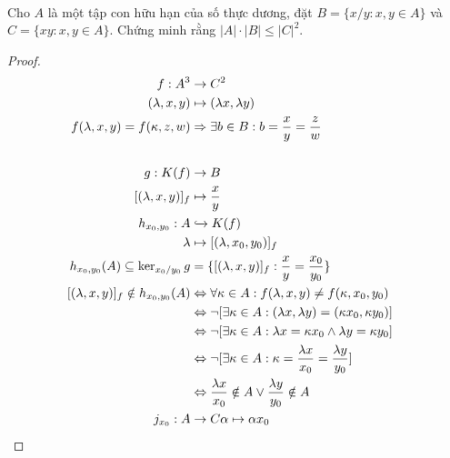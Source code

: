 \documentclass{treatise}
\begin{document}
\ \\
\begin{exercise}
Cho $A$ là một tập con hữu hạn của số thực dương, đặt $B = \{ x/y : x, y \in A \}$ và $C = \{ xy : x, y \in A \}$. Chứng minh rằng $|A| \cdot |B| \leq |C|^2$.
\end{exercise}
\begin{proof}
\begin{align*}
f: A^3 & \to C^2 \\
(\lambda, x, y) & \mapsto (\lambda x, \lambda y) \\
f(\lambda, x, y) = f(\kappa, z, w) & \Rightarrow \exists b \in B: b = \frac{x}{y} = \frac{z}{w} \\
& \\
g: K(f) & \to B \\
[(\lambda, x, y)]_f & \mapsto \frac{x}{y} \\
h_{x_0, y_0}: A & \xhookrightarrow{} K(f) \\
\lambda & \mapsto [(\lambda, x_0, y_0)]_f \\
h_{x_0, y_0} (A) \subseteq \ker_{x_0/y_0} g & = \{ [(\lambda, x, y)]_f : \frac{x}{y}=\frac{x_0}{y_0} \} \\
[(\lambda, x, y)]_f \notin h_{x_0, y_0} (A) & \Leftrightarrow \forall \kappa \in A: f(\lambda, x, y) \neq f(\kappa, x_0, y_0) \\
& \Leftrightarrow \neg [\exists \kappa \in A: (\lambda x, \lambda y) = (\kappa x_0, \kappa y_0)] \\
& \Leftrightarrow \neg [\exists \kappa \in A: \lambda x = \kappa x_0 \wedge \lambda y = \kappa y_0] \\
& \Leftrightarrow \neg [\exists \kappa \in A: \kappa = \frac{\lambda x}{x_0} = \frac{\lambda y}{y_0}] \\
& \Leftrightarrow \frac{\lambda x}{x_0} \notin A \vee \frac{\lambda y}{y_0} \notin A
& \\
j_{x_0} : A & \to C
\alpha \mapsto \alpha x_0

\end{align*}

\end{proof}

\newpage
\end{document}
